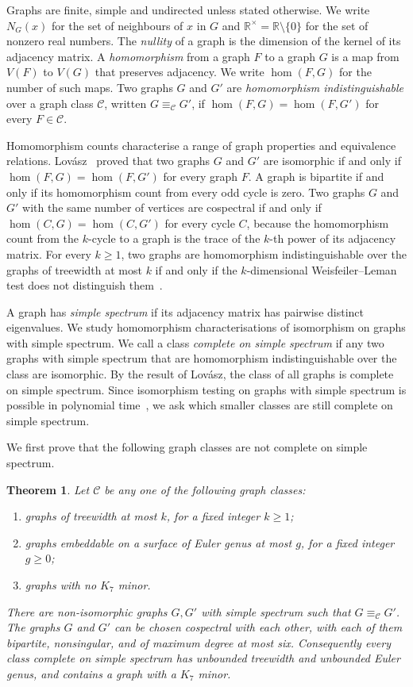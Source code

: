 \documentclass[10pt,a4paper]{article}
\theoremstyle{plain}
\newtheorem{theorem}{Theorem}
\theoremstyle{definition}
\newcommand{\R}{\mathbb{R}}
\begin{document}
Graphs are finite, simple and undirected unless stated otherwise.
We write $N_G(x)$ for the set of neighbours of $x$ in $G$ and
$\R^\times=\R\setminus\{0\}$ for the set of nonzero real numbers.
The \emph{nullity} of a graph is the dimension of the kernel of its
adjacency matrix.
A \emph{homomorphism} from a graph $F$ to a graph $G$
is a map from $V(F)$ to $V(G)$ that preserves adjacency. We write
$\hom(F,G)$ for the number of such maps. Two graphs $G$ and $G'$ are \emph{homomorphism
indistinguishable} over a graph class $\mathcal C$, written
$G\equiv_{\mathcal C}G'$, if
$\hom(F,G)=\hom(F,G')$ for every $F\in\mathcal C$.

Homomorphism counts characterise a range of graph properties and
equivalence relations. Lov\'asz~\cite{Lovasz1967} proved that two graphs
$G$ and $G'$ are isomorphic if and only if $\hom(F,G)=\hom(F,G')$ for every
graph $F$.
A graph is bipartite if and only if its homomorphism count from every odd
cycle is zero. Two graphs $G$ and $G'$ with the same number of vertices
are cospectral if and only if $\hom(C,G)=\hom(C,G')$ for every cycle $C$,
because the homomorphism count from the $k$-cycle to a graph is the trace
of the $k$-th power of its adjacency matrix. For every $k\geq1$, two graphs are
homomorphism indistinguishable over the graphs of treewidth at most $k$ if
and only if the $k$-dimensional Weisfeiler--Leman test does not distinguish
them~\cite{Dvorak2010,DellGroheRattan2018}.

A graph has \emph{simple spectrum} if its adjacency matrix has pairwise
distinct eigenvalues. We study homomorphism characterisations of
isomorphism on graphs with simple spectrum.
We call a class \emph{complete on simple spectrum} if any two graphs with
simple spectrum that are homomorphism indistinguishable over the class
are isomorphic.
By the result of Lov\'asz, the class of all graphs is complete on simple
spectrum. Since isomorphism testing on graphs with simple spectrum is
possible in polynomial time~\cite{BabaiGrigoryevMount1982}, we ask which
smaller classes are still complete on simple spectrum.

We first prove that the following graph classes are not complete on
simple spectrum.

\begin{theorem}\label{thm:incompleteness}
Let $\mathcal C$ be any one of the following graph classes:
\begin{enumerate}
 \item graphs of treewidth at most $k$, for a fixed integer $k\geq1$;
 \item graphs embeddable on a surface of Euler genus at most $g$, for a fixed integer $g\geq0$;
 \item graphs with no $K_7$ minor.
\end{enumerate}
There are non-isomorphic graphs $G,G'$ with simple spectrum such that
$G\equiv_{\mathcal C}G'$.
The graphs $G$ and $G'$ can be chosen cospectral with each other, with
each of them bipartite, nonsingular, and of maximum degree at most six.
Consequently every class complete on simple spectrum has unbounded treewidth
and unbounded Euler genus, and contains a graph with a $K_7$ minor.
\end{theorem}
\end{document}
